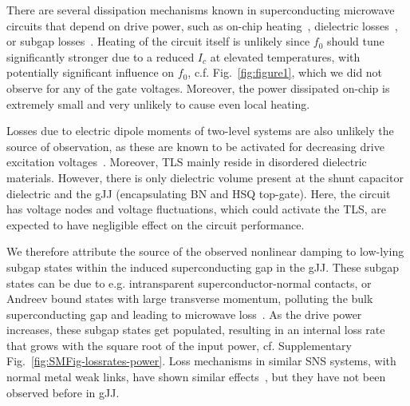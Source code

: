There are several dissipation mechanisms known in superconducting microwave circuits that depend on drive power, such as on-chip heating~\cite{portisPowerinducedSwitchingHTS1991,heinFundamentalLimitsLinear1997,wosikPowerHandlingCapabilities1997}, dielectric losses~\cite{martinisDecoherenceJosephsonQubits2005c,oconnellMicrowaveDielectricLoss2008a,gunnarssonDielectricLossesMultilayer2013,lisenfeldElectricFieldSpectroscopy2019}, or subgap losses~\cite{dassonnevilleDissipationSupercurrentFluctuations2013,ferrierPhasedependentAndreevSpectrum2013,dassonnevilleCoherenceenhancedPhasedependentDissipation2018}.
%
Heating of the circuit itself is unlikely since $f_0$ should tune significantly stronger due to a reduced $I_c$ at elevated temperatures, with potentially significant influence on $f_0$, c.f. Fig.~\ref{fig:figure1}, which we did not observe for any of the gate voltages.
%
Moreover, the power dissipated on-chip is extremely small and very unlikely to cause even local heating.

Losses due to electric dipole moments of two-level systems are also unlikely the source of observation, as these are known to be activated for decreasing drive excitation voltages~\cite{martinisDecoherenceJosephsonQubits2005c,oconnellMicrowaveDielectricLoss2008a,gunnarssonDielectricLossesMultilayer2013}.
%
Moreover, TLS mainly reside in disordered dielectric materials.
%
However, there is only dielectric volume present at the shunt capacitor dielectric and the gJJ (encapsulating BN and HSQ top-gate).
%
Here, the circuit has voltage nodes and voltage fluctuations, which could activate the TLS, are expected to have negligible effect on the circuit performance.

We therefore attribute the source of the observed nonlinear damping to low-lying subgap states within the induced superconducting gap in the gJJ.
%
These subgap states can be due to e.g. intransparent superconductor-normal contacts, or Andreev bound states with large transverse momentum, polluting the bulk superconducting gap and leading to microwave loss~\cite{schmidtBallisticGrapheneSuperconducting2018}.
%
As the drive power increases, these subgap states get populated, resulting in an internal loss rate that grows with the square root of the input power, cf. Supplementary Fig.~\ref{fig:SMFig-lossrates-power}.
%
Loss mechanisms in similar SNS systems, with normal metal weak links, have shown similar effects~\cite{fuechsleEffectMicrowavesCurrentPhase2009,dassonnevilleDissipationSupercurrentFluctuations2013}, but they have not been observed before in gJJ.

